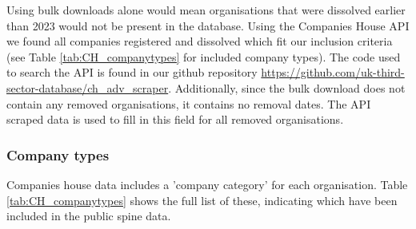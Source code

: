 \documentclass{article}
\begin{document}
Using bulk downloads alone would mean organisations that were dissolved earlier than 2023 would 
not be present in the database. Using the Companies House API
we found all companies registered and dissolved which fit our inclusion criteria (see Table \ref{tab:CH_companytypes} for included
company types). 
The code used to search the API is found in our 
github repository 
\url{https://github.com/uk-third-sector-database/ch_adv_scraper}. Additionally, since the bulk download does not contain any removed organisations, it contains no
removal dates. The API scraped data is used to fill in this field for all removed organisations.



\subsubsection{Company types}
Companies house data includes a 'company category' for each organisation. Table \ref{tab:CH_companytypes} shows the 
full list of these, indicating which have been included in the public spine data.
\end{document}
